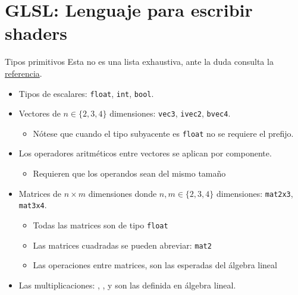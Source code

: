 \section{GLSL: Lenguaje para escribir shaders}

\begin{frame}[fragile]{Tipos primitivos}
Esta \alert{no es} una lista exhaustiva, ante la duda consulta la \href{https://www.khronos.org/opengl/wiki/Data_Type_(GLSL)}{referencia}.
\begin{itemize}
    \item Tipos de escalares: \texttt{float}, \texttt{int}, \texttt{bool}.
    \item Vectores de $n \in \{2, 3, 4\}$ dimensiones: \texttt{vec3}, \texttt{ivec2}, \texttt{bvec4}.
    \begin{itemize}
        \item Nótese que cuando el tipo subyacente es \texttt{float} no se requiere el prefijo.
    \end{itemize}
    \item Los operadores aritméticos entre vectores se aplican por componente.
    \begin{itemize}
        \item Requieren que los operandos sean del mismo tamaño
    \end{itemize}
    \item Matrices de $n\times m$ dimensiones donde $n, m \in \{2, 3, 4\}$ dimensiones: \texttt{mat2x3}, \texttt{mat3x4}.
    \begin{itemize}
        \item Todas las matrices son de tipo \texttt{float}
        \item Las matrices cuadradas se pueden abreviar: \texttt{mat2}
        \item Las operaciones entre matrices, son las esperadas del álgebra lineal
    \end{itemize}
    \item Las multiplicaciones: , ,  y   son las definida en álgebra lineal.
\end{itemize}

\end{frame}

